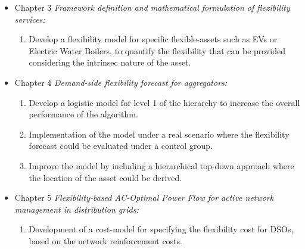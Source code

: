 \begin{itemize}
\item Chapter 3 \textit{Framework definition and mathematical formulation of flexibility services:} 
	\begin{enumerate}
		\item Develop a flexibility model for specific flexible-assets such as EVs or Electric Water Boilers, to quantify the flexibility that can be provided considering the intrinsec nature of the asset. 
	\end{enumerate}
\item Chapter 4 \textit{Demand-side flexibility forecast for aggregators:} 
	\begin{enumerate}
		\item Develop a logistic model for level 1 of the hierarchy to increase the overall performance of the algorithm. 
		\item Implementation of the model under a real scenario where the flexibility forecast could be evaluated under a control group.  
		\item Improve the model by including a hierarchical top-down approach where the location of the asset could be derived. 
	\end{enumerate}
\item Chapter 5 \textit{Flexibility-based AC-Optimal Power Flow for active network management in distribution grids:} 
	\begin{enumerate}
		\item Development of a cost-model for specifying the flexibility cost for DSOs, based on the network reinforcement costs. 

\end{enumerate}
\end{itemize}

